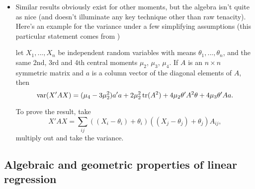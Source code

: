 \begin{itemize}
\item Similar results obviously exist for other moments, but the
  algebra isn't quite as nice (and doesn't illuminate any key
  technique other than raw tenacity).  Here's an example for the
  variance under a few simplifying assumptions (this particular
  statement comes from \citealp{SL03})
  \begin{thm}
    let $X_1,...,X_n$ be independent random variables with means
    $\theta_1,...,\theta_n$, and the same 2nd, 3rd and 4th central
    moments $\mu_2$, $\mu_3$, $\mu_4$.  If $A$ is an $n \times n$
    symmetric matrix and $a$ is a column vector of the diagonal
    elements of $A$, then
    \begin{equation*}
      \operatorname{var}(X'AX) = 
      (\mu_4 - 3 \mu_2^2)a'a + 2 \mu_2^2 \operatorname{tr}(A^2) + 4 \mu_2 \theta'A^2 \theta + 4 \mu_3 \theta' A a.
    \end{equation*}
  \end{thm}
  To prove the result, take
  \begin{equation*}
    X'A X = \sum_{ij} ((X_i - \theta_i) + \theta_i) ((X_j - \theta_j) + \theta_j) A_{ij},
  \end{equation*}
  multiply out and take the variance.

\end{itemize}

\subsection{Algebraic and geometric properties of linear regression}

